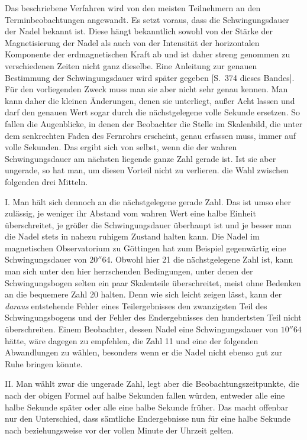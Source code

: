 Das beschriebene Verfahren wird von den meisten Teilnehmern an den Terminbeobachtungen angewandt. Es setzt voraus, dass die Schwingungsdauer der Nadel bekannt ist. Diese hängt bekanntlich sowohl von der Stärke der
Magnetisierung der Nadel als auch von der Intensität der horizontalen Komponente der erdmagnetischen Kraft ab und ist daher streng genommen zu verschiedenen Zeiten nicht ganz dieselbe. Eine Anleitung zur genauen Bestimmung der Schwingungsdauer wird später gegeben [S.\ 374 dieses Bandes]. Für den vorliegenden Zweck muss man sie aber nicht sehr genau kennen. Man kann daher die kleinen Änderungen, denen sie unterliegt, außer Acht lassen und darf den genauen Wert sogar durch die nächstgelegene volle Sekunde ersetzen. So fallen die Augenblicke, in denen der Beobachter die Stelle im Skalenbild, die unter dem senkrechten Faden des Fernrohrs erscheint, genau erfassen muss, immer auf volle Sekunden. Das ergibt sich von selbst, wenn die der wahren Schwingungsdauer am nächsten liegende ganze Zahl gerade ist. Ist sie aber ungerade, so hat man, um diesen Vorteil nicht zu verlieren. die Wahl zwischen folgenden drei Mitteln.

I. Man hält sich dennoch an die nächstgelegene gerade Zahl. Das ist umso eher zulässig, je weniger ihr Abstand vom wahren Wert eine halbe Einheit überschreitet, je größer die Schwingungsdauer überhaupt ist und je besser man die Nadel stets in nahezu ruhigem Zustand halten kann. Die Nadel im magnetischen Observatorium zu Göttingen hat zum Beispiel gegenwärtig eine Schwingungsdauer von $20''64$. Obwohl hier 21 die nächstgelegene Zahl ist, kann man sich unter den hier herrschenden Bedingungen, unter denen der Schwingungsbogen selten ein paar Skalenteile überschreitet, meist ohne Bedenken an die bequemere Zahl 20 halten. Denn wie sich leicht zeigen lässt, kann der \textit{daraus} entstehende Fehler eines Teilergebnisses den zwanzigsten Teil des Schwingungsbogens und der Fehler des Endergebnisses den hundertsten Teil nicht überschreiten. Einem Beobachter, dessen Nadel eine Schwingungsdauer von $10''64$ hätte, wäre dagegen zu empfehlen, die Zahl 11 und eine der folgenden Abwandlungen zu wählen, besonders wenn er die Nadel nicht ebenso gut zur Ruhe bringen könnte.

II. Man wählt zwar die ungerade Zahl, legt aber die Beobachtungszeitpunkte, die nach der obigen Formel auf halbe Sekunden fallen würden, entweder alle eine halbe Sekunde später oder alle eine halbe Sekunde früher. Das macht offenbar nur den Unterschied, dass sämtliche Endergebnisse nun für eine halbe Sekunde nach beziehungsweise vor der vollen Minute der Uhrzeit gelten.

